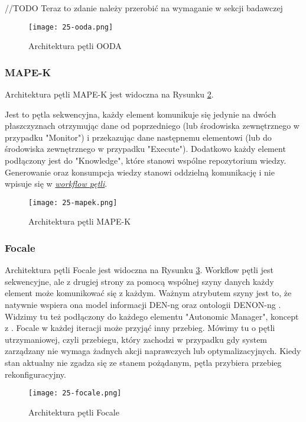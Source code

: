 //TODO Teraz to zdanie należy przerobić na wymaganie w sekcji badawczej

\begin{figure}[!h]
    \centering \texttt{[image: 25-ooda.png]}
    \caption{Architektura pętli OODA}\label{fig:25-ooda}
\end{figure}

\subsubsection{MAPE-K}
Architektura pętli MAPE-K \cite{kephart2003} jest widoczna na Rysunku \ref{fig:25-mapek}.

Jest to pętla sekwencyjna, każdy element komunikuje się jedynie na dwóch płaszczyznach otrzymując dane od poprzedniego (lub środowiska zewnętrznego w przypadku "Monitor") i przekazując dane następnemu elementowi (lub do środowiska zewnętrznego w przypadku "Execute"). Dodatkowo każdy element podłączony jest do "Knowledge", które stanowi wspólne repozytorium wiedzy. Generowanie oraz konsumpcja wiedzy stanowi oddzielną komunikację i nie wpisuje się w \hyperlink{def:workflow}{\textit{workflow pętli}}. 

\begin{figure}[!h]
    \centering \texttt{[image: 25-mapek.png]}
    \caption{Architektura pętli MAPE-K}\label{fig:25-mapek}
\end{figure}

\subsubsection{Focale}
Architektura pętli Focale \cite{strassner2007} jest widoczna na Rysunku \ref{fig:25-focale}. Workflow pętli jest sekwencyjne, ale z drugiej strony za pomocą wspólnej szyny danych każdy element może komunikować się z każdym. Ważnym atrybutem szyny jest to, że natywnie wspiera ona model informacji DEN-ng \cite{strassner2003} oraz ontologii DENON-ng \cite{strassner2007}. Widzimy tu też podłączony do każdego elementu "Autonomic Manager", koncept z \cite{kephart2003}. Focale w każdej iteracji może przyjąć inny przebieg. Mówimy tu o pętli utrzymaniowej, czyli przebiegu, który zachodzi w przypadku gdy system zarządzany nie wymaga żadnych akcji naprawczych lub optymalizacyjnych. Kiedy stan aktualny nie zgadza się ze stanem pożądanym, pętla przybiera przebieg rekonfiguracyjny.

\begin{figure}[!h]
    \centering \texttt{[image: 25-focale.png]}
    \caption{Architektura pętli Focale}\label{fig:25-focale}
\end{figure}

